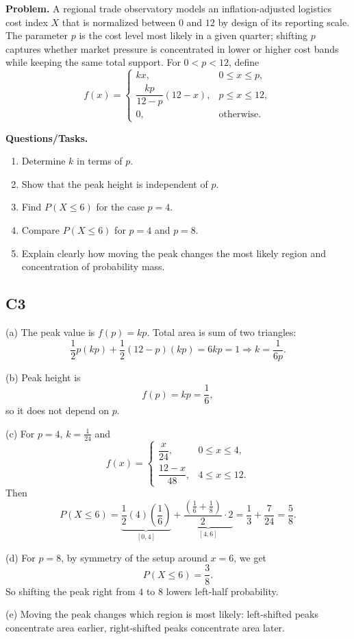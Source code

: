 \textbf{Problem.}
A regional trade observatory models an inflation-adjusted logistics cost index $X$ that is normalized between $0$ and $12$ by design of its reporting scale. The parameter $p$ is the cost level most likely in a given quarter; shifting $p$ captures whether market pressure is concentrated in lower or higher cost bands while keeping the same total support. For $0<p<12$, define
\[
f(x)=\begin{cases}
kx, & 0\le x\le p,\\
\dfrac{kp}{12-p}(12-x), & p\le x\le 12,\\
0, & \text{otherwise.}
\end{cases}
\]

\textbf{Questions/Tasks.}
\begin{enumerate}[label=(\alph*)]
\item Determine $k$ in terms of $p$.
\item Show that the peak height is independent of $p$.
\item Find $P(X\le 6)$ for the case $p=4$.
\item Compare $P(X\le 6)$ for $p=4$ and $p=8$.
\item Explain clearly how moving the peak changes the most likely region and concentration of probability mass.
\end{enumerate}

\subsection*{C3}
(a) The peak value is $f(p)=kp$.
Total area is sum of two triangles:
\[
\frac12 p(kp)+\frac12(12-p)(kp)=6kp=1
\Rightarrow
k=\frac{1}{6p}.
\]

(b) Peak height is
\[
f(p)=kp=\frac{1}{6},
\]
so it does not depend on $p$.

(c) For $p=4$, $k=\frac{1}{24}$ and
\[
f(x)=\begin{cases}
\dfrac{x}{24}, & 0\le x\le 4,\\
\dfrac{12-x}{48}, & 4\le x\le 12.
\end{cases}
\]
Then
\[
P(X\le 6)=\underbrace{\frac12(4)\left(\frac16\right)}_{[0,4]}+\underbrace{\frac{\left(\frac16+\frac18\right)}{2}\cdot2}_{[4,6]}=\frac13+\frac{7}{24}=\frac58.
\]

(d) For $p=8$, by symmetry of the setup around $x=6$, we get
\[
P(X\le 6)=\frac38.
\]
So shifting the peak right from $4$ to $8$ lowers left-half probability.

(e) Moving the peak changes which region is most likely: left-shifted peaks concentrate area earlier, right-shifted peaks concentrate area later.

